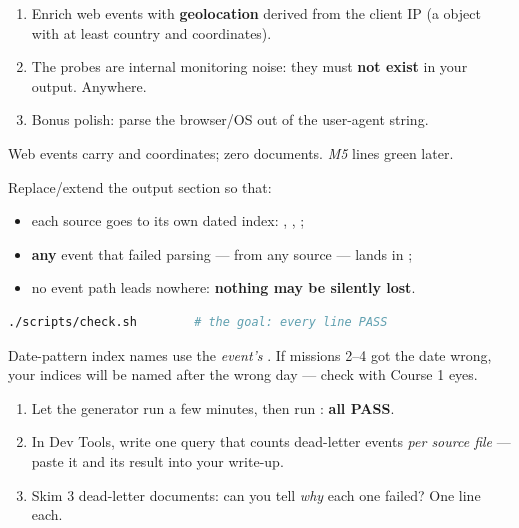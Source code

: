 \documentclass[11pt,a4paper]{article}
\begin{document}
\begin{enumerate}
  \item Enrich web events with \textbf{geolocation} derived from the client IP
        (a  object with at least country and coordinates).
  \item The  probes are internal monitoring noise: they must
        \textbf{not exist} in your output. Anywhere.
  \item Bonus polish: parse the browser/OS out of the user-agent string.
\end{enumerate}

\begin{whybox}
Web events carry  and coordinates; zero
 documents.  \emph{M5} lines green later.
\end{whybox}


Replace/extend the output section so that:
\begin{itemize}
  \item each source goes to its own dated index:
        , ,
        ;
  \item \textbf{any} event that failed parsing — from any source — lands in
        ;
  \item no event path leads nowhere: \textbf{nothing may be silently lost}.
\end{itemize}

\begin{lstlisting}[language=bash]
./scripts/check.sh        # the goal: every line PASS
\end{lstlisting}

\begin{trapbox}
Date-pattern index names use the \emph{event's} . If missions
2--4 got the date wrong, your indices will be named after the wrong day —
check  with Course 1 eyes.
\end{trapbox}


\begin{enumerate}
  \item Let the generator run a few minutes, then run :
        \textbf{all PASS}.
  \item In Dev Tools, write one query that counts dead-letter events \emph{per
        source file} — paste it and its result into your write-up.
  \item Skim 3 dead-letter documents: can you tell \emph{why} each one failed?
        One line each.
\end{enumerate}
\end{document}
